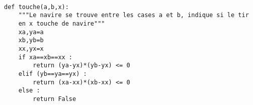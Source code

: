 \exer{}
\setcounter{numques}{0}

\question{}
\begin{lstlisting}

def touche(a,b,x):
    """Le navire se trouve entre les cases a et b, indique si le tir
    en x touche de navire"""
    xa,ya=a
    xb,yb=b
    xx,yx=x
    if xa==xb==xx :
        return (ya-yx)*(yb-yx) <= 0
    elif (yb==ya==yx) :
        return (xa-xx)*(xb-xx) <= 0
    else :
        return False 
\end{lstlisting}


